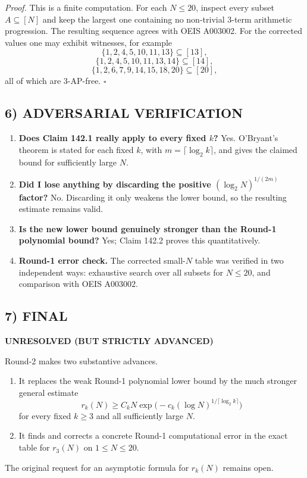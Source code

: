 \smallskip
\noindent\emph{Proof.}
This is a finite computation.  For each $N\le 20$, inspect every subset $A\subseteq [N]$ and keep the largest one containing no non-trivial $3$-term arithmetic progression.  The resulting sequence agrees with OEIS A003002.  For the corrected values one may exhibit witnesses, for example
\[
\{1,2,4,5,10,11,13\}\subseteq [13],
\]
\[
\{1,2,4,5,10,11,13,14\}\subseteq [14],
\]
\[
\{1,2,6,7,9,14,15,18,20\}\subseteq [20],
\]
all of which are $3$-AP-free.
\hfill$\square$

\subsection*{6) ADVERSARIAL VERIFICATION}
\begin{enumerate}
\item \textbf{Does Claim 142.1 really apply to every fixed $k$?}  Yes.  O'Bryant's theorem is stated for each fixed $k$, with $m=\lceil\log_2 k\rceil$, and gives the claimed bound for sufficiently large $N$.

\item \textbf{Did I lose anything by discarding the positive $(\log_2 N)^{1/(2m)}$ factor?}  No.  Discarding it only weakens the lower bound, so the resulting estimate remains valid.

\item \textbf{Is the new lower bound genuinely stronger than the Round-1 polynomial bound?}  Yes; Claim 142.2 proves this quantitatively.

\item \textbf{Round-1 error check.}  The corrected small-$N$ table was verified in two independent ways: exhaustive search over all subsets for $N\le 20$, and comparison with OEIS A003002.
\end{enumerate}

\subsection*{7) FINAL}
\textbf{UNRESOLVED (BUT STRICTLY ADVANCED)}

Round-2 makes two substantive advances.
\begin{enumerate}
\item It replaces the weak Round-1 polynomial lower bound by the much stronger general estimate
\[
r_k(N) \ge C_k N\exp\bigl(-c_k(\log N)^{1/\lceil\log_2 k\rceil}\bigr)
\]
for every fixed $k\ge 3$ and all sufficiently large $N$.
\item It finds and corrects a concrete Round-1 computational error in the exact table for $r_3(N)$ on $1\le N\le 20$.
\end{enumerate}
The original request for an asymptotic formula for $r_k(N)$ remains open.

